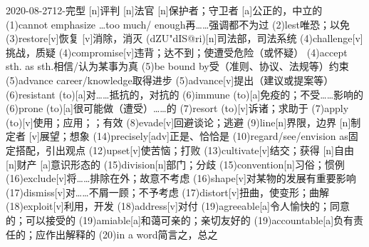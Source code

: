 \documentclass[12pt]{ctexart}
\begin{document}
\begin{wordlist}{2020-08-27}{12-完型}
  [n]{评判}
  [n]{法官}
  [n]{保护者；守卫者}
  [a]{公正的，中立的}
  \word(1){cannot emphasize \dots too much/ enough}{再……强调都不为过}
  \word(2){lest}{唯恐；以免}
  \word[2020-09-11](3){restore}[v]{恢复}
  [v]{消除，消灭}
  (dZU"dIS@ri)[n]{司法部，司法系统}
  \word(4){challenge}[v]{挑战，质疑}
  \word(4){compromise}[v]{违背；达不到；使遭受危险（或怀疑）}
  \word(4){accept sth. as sth.}{相信/认为某事为真}
  \word[2020-09-03](5){be bound by}{受（准则、协议、法规等）约束}
  \word(5){advance career/knowledge}{取得进步}
  \word[2020-09-11](5){advance}[v]{提出（建议或提案等）}
  \word(6){resistant (to)}[a]{对……抵抗的，对抗的}
  \word(6){immune (to)}[a]{免疫的；不受……影响的}
  \word[2020-08-29](6){prone (to)}[a]{很可能做（遭受）……的}
  \word(7){resort (to)}[v]{诉诸；求助于}
  \word(7){apply (to)}[v]{使用；应用；；有效}
  \word(8){evade}[v]{回避谈论；逃避}
  \word(9){line}[n]{界限，边界}
  [n]{制定者}
  [v]{展望；想象}
  \word(14){precisely}[adv]{正是、恰恰是}
  \word(10){regard/see/envision as}{固定搭配，引出观点}
  \word(12){upset}[v]{使苦恼；打败}
  \word(13){cultivate}[v]{结交；获得}
  [n]{自由}
  [n]{财产}
  [a]{意识形态的}
  \word(15){division}[n]{部门；分歧}
  \word(15){convention}[n]{习俗；惯例}
  \word(16){exclude}[v]{将……排除在外；故意不考虑}
  \word(16){shape}[v]{对某物的发展有重要影响}
  \word(17){dismiss}[v]{对……不屑一顾；不予考虑}
  \word[2020-08-29](17){distort}[v]{扭曲，使变形；曲解}
  \word[2020-08-29](18){exploit}[v]{利用，开发}
  \word(18){address}[v]{对付}
  \word(19){agreeable}[a]{令人愉快的；同意的；可以接受的}
  \word[2020-08-31](19){amiable}[a]{和蔼可亲的；亲切友好的}
  \word[2020-08-29](19){accountable}[a]{负有责任的；应作出解释的}
  \word(20){in a word}{简言之，总之}
\end{wordlist}
\end{document}
